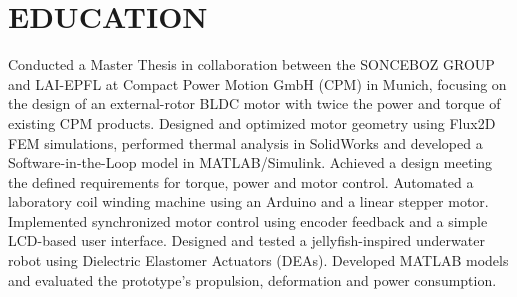 \documentclass[10pt,a4paper,sans]{moderncv}
\begin{document}
    \section{EDUCATION}
    {
        Conducted a Master Thesis in collaboration between the SONCEBOZ GROUP and LAI-EPFL at Compact Power Motion GmbH (CPM) in Munich, focusing on the design of an external-rotor BLDC motor with twice the power and torque of existing CPM products. Designed and optimized motor geometry using Flux2D FEM simulations, performed thermal analysis in SolidWorks and developed a Software-in-the-Loop model in MATLAB/Simulink. Achieved a design meeting the defined requirements for torque, power and motor control.
    }
    {
        Automated a laboratory coil winding machine using an Arduino and a linear stepper motor. Implemented synchronized motor control using encoder feedback and a simple LCD-based user interface.
    }
    {
        Designed and tested a jellyfish-inspired underwater robot using Dielectric Elastomer Actuators (DEAs). Developed MATLAB models and evaluated the prototype's propulsion, deformation and power consumption.
    }
\end{document}
